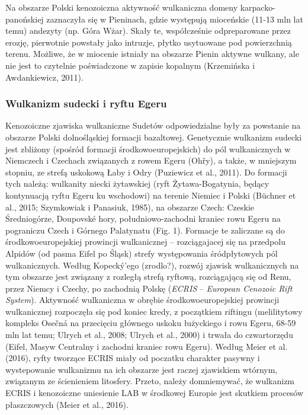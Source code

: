 \documentclass[11.5pt,twoside]{report}
\begin{document}
Na obszarze Polski kenozoiczna aktywność wulkaniczna domeny karpacko-panońskiej zaznaczyła się w Pieninach, gdzie występują mioceńskie (11-13 mln lat temu) andezyty (np. Góra Wżar). Skały te, współcześnie odpreparowane przez erozję, pierwotnie powstały jako intruzje, płytko usytuowane pod powierzchnią terenu. Możliwe, że w miocenie istniały na obszarze Pienin aktywne wulkany, ale nie jest to czytelnie poświadczone w zapisie kopalnym (Krzemińska i Awdankiewicz, 2011).

	\subsubsection{Wulkanizm sudecki i ryftu Egeru}

Kenozoiczne zjawiska wulkaniczne Sudetów odpowiedzialne były za powstanie na obszarze Polski dolnośląskiej formacji bazaltowej. Genetycznie wulkanizm sudecki jest zbliżony (spośród formacji środkowoeuropejskich) do pól wulkanicznych w Niemczech i Czechach związanych z rowem Egeru (Oh\v{r}y), a także, w mniejszym stopniu, ze strefą uskokową Łaby i Odry (Puziewicz et al., 2011). Do formacji tych należą: wulkanity niecki żytawskiej (ryft Żytawa-Bogatynia, będący kontynuacją ryftu Egeru ku wschodowi) na terenie Niemiec i Polski (B\"{u}chner et al., 2015; Szymkowiak i Panasiuk, 1985), na obszarze Czech: Czeskie Średniogórze, Doupovské hory, południowo-zachodni kraniec rowu Egeru na pograniczu Czech i Górnego Palatynatu (Fig. 1). Formacje te zaliczane są do środkowoeuropejskiej prowincji wulkanicznej -- rozciągajacej się na przedpolu Alpidów (od pasma Eifel po Śląsk) strefy występowania śródpłytowych pól wulkanicznych. Według Kopeck\'{y}'ego (zrodlo?), rozwój zjawisk wulkanicznych na tym obszarze jest związany z rozległą strefą ryftową, rozciągającą się od Renu, przez Niemcy i Czechy, po zachodnią Polskę (\textit{ECRIS} -- \textit{European Cenozoic Rift System}). Aktywność wulkaniczna w obrębie środkowoeuropejskiej prowincji wulkanicznej rozpoczęła się pod koniec kredy, z początkiem riftingu (melilitytowy kompleks Osečná na przecięciu głównego uskoku łużyckiego i rowu Egeru, 68-59 mln lat temu; Ulrych et al., 2008; Ulrych et al., 2000) i trwała do czwartorzędu (Eifel, Masyw Centralny i zachodni kraniec rowu Egeru). Według Meier et al. (2016), ryfty tworzące ECRIS miały od poczatku charakter pasywny i wystepowanie wulkanizmu na ich obszarze jest raczej zjawiskiem wtórnym, związanym ze ścienieniem litosfery. Przeto, należy domniemywać, że wulkanizm ECRIS i kenozoiczne uniesienie LAB w środkowej Europie jest skutkiem procesów płaszczowych (Meier et al., 2016).
\end{document}
